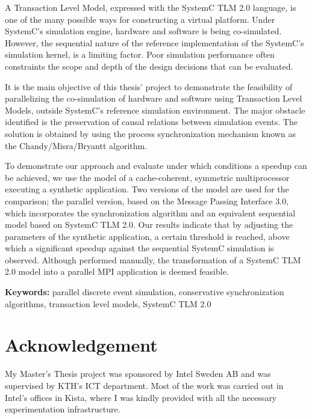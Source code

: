 \documentclass[11pt]{article}
\begin{document}
A Transaction Level Model, expressed with the SystemC TLM 2.0 language, is one of the many possible ways for constructing a virtual platform.
Under SystemC's simulation engine, hardware and software is being co-simulated.
However, the sequential nature of the reference implementation of the SystemC's simulation kernel, is a limiting factor.
Poor simulation performance often constraints the scope and depth of the design decisions that can be evaluated.

It is the main objective of this thesis' project to demonstrate the feasibility of parallelizing the co-simulation of hardware and software using Transaction Level Models, outside SystemC's reference simulation environment.
The major obstacle identified is the preservation of causal relations between simulation events.
The solution is obtained by using the process synchronization mechanism known as the Chandy/Misra/Bryantt algorithm.

To demonstrate our approach and evaluate under which conditions a speedup can be achieved, we use the model of a cache-coherent, symmetric multiprocessor executing a synthetic application. 
Two versions of the model are used for the comparison; the parallel version, based on the Message Passing Interface 3.0, which incorporates the synchronization algorithm and an equivalent sequential model based on SystemC TLM 2.0.
Our results indicate that by adjusting the parameters of the synthetic application, a certain threshold is reached, above which a significant speedup against the sequential SystemC simulation is observed.
Although performed manually, the transformation of a SystemC TLM 2.0 model into a parallel MPI application is deemed feasible.

\textbf{Keywords:} parallel discrete event simulation, conservative synchronization algorithms, transaction level models, SystemC TLM 2.0



\clearpage

\section*{Acknowledgement}
\label{sec:org682bfd5}
\pagestyle{empty}

My Master's Thesis project was sponsored by Intel Sweden AB and was supervised by KTH's ICT department.
Most of the work was carried out in Intel's offices in Kista, where I was kindly provided with all the necessary experimentation infrastructure.\\
\end{document}
